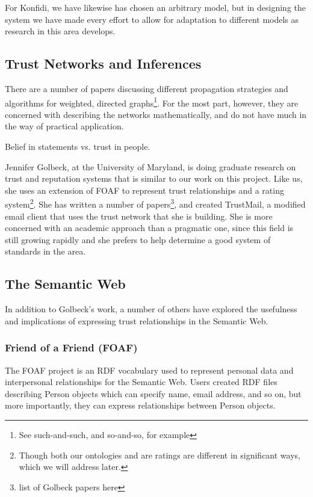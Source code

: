 \documentclass[onecolumn]{acm_proc_article-sp}
\begin{document}
For Konfidi, we have likewise has chosen an arbitrary model, but in designing the system we have made every effort to allow for adaptation to different models as research in this area develops. 

\subsection{Trust Networks and Inferences}
There are a number of papers discussing different propagation strategies and algorithms for weighted, directed graphs\footnote{See such-and-such, and so-and-so, for example}.  For the most part, however, they are concerned with describing the networks mathematically, and do not have much in the way of practical application. 

Belief in statements vs. trust in people.

Jennifer Golbeck, at the University of Maryland, is doing graduate research on trust and reputation systems\cite{golbeckSite} that is similar to our work on this project.  Like us, she uses an extension of FOAF to represent trust relationships and a rating system\footnote{Though both our ontologies and are ratings are different in significant ways, which we will address later.}.  She has written a number of papers\footnote{list of Golbeck papers here}, and created TrustMail\cite{trustMail}, a modified email client that uses the trust network that she is building.  She is more concerned with an academic approach than a pragmatic one, since this field is still growing rapidly and she prefers to help determine a good system of standards in the area.

\subsection{The Semantic Web}
In addition to Golbeck's work, a number of others have explored the usefulness and implications of expressing trust relationships in the Semantic Web.

\subsubsection{Friend of a Friend (FOAF)}
\label{foaf}
The FOAF project\cite{foafProject} is an RDF vocabulary used to represent personal data and interpersonal relationships for the Semantic Web.  Users created RDF files describing Person objects which can specify name, email address, and so on, but more importantly, they can express relationships between Person objects.  
\end{document}
